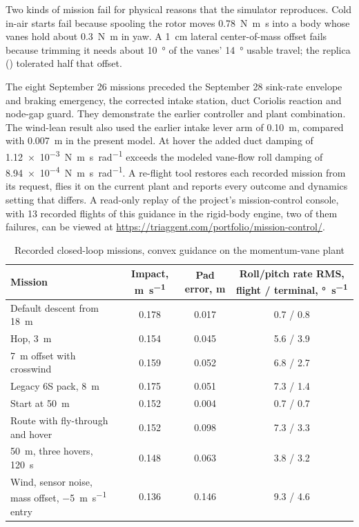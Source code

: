 \documentclass[10pt,letterpaper]{article}
\begin{document}
Two kinds of mission fail for physical reasons that the simulator reproduces.
Cold in-air starts fail because spooling the rotor moves \SI{0.78}{\newton\metre\second} into a body whose vanes hold about \SI{0.3}{\newton\metre} in yaw.
A \SI{1}{\centi\metre} lateral center-of-mass offset fails because trimming it needs about \SI{10}{\degree} of the vanes' \SI{14}{\degree} usable travel; the replica () tolerated half that offset.

The eight September 26 missions preceded the September 28 sink-rate envelope and braking emergency, the corrected intake station, duct Coriolis reaction and node-gap guard. They demonstrate the earlier controller and plant combination.
The wind-lean result also used the earlier intake lever arm of \SI{0.10}{\metre}, compared with \SI{0.007}{\metre} in the present model.
At hover the added duct damping of \SI{1.12e-3}{\newton\metre\second\per\radian} exceeds the modeled vane-flow roll damping of \SI{8.94e-4}{\newton\metre\second\per\radian}.
A re-flight tool restores each recorded mission from its request, flies it on the current plant and reports every outcome and dynamics setting that differs.
A read-only replay of the project's mission-control console, with 13 recorded flights of this guidance in the rigid-body engine, two of them failures, can be viewed at \url{https://triaggent.com/portfolio/mission-control/}.

\begin{table}[t]
\caption{Recorded closed-loop missions, convex guidance on the momentum-vane plant}
\label{tab:missions}
\centering
\small
\begin{tabular}{lccc}
\toprule
Mission & Impact, \si{\metre\per\second} & Pad error, \si{\metre} & Roll/pitch rate RMS, flight / terminal, \si{\degree\per\second} \\
\midrule
Default descent from \SI{18}{\metre} & 0.178 & 0.017 & 0.7 / 0.8 \\
Hop, \SI{3}{\metre} & 0.154 & 0.045 & 5.6 / 3.9 \\
\SI{7}{\metre} offset with crosswind & 0.159 & 0.052 & 6.8 / 2.7 \\
Legacy 6S pack, \SI{8}{\metre} & 0.175 & 0.051 & 7.3 / 1.4 \\
Start at \SI{50}{\metre} & 0.152 & 0.004 & 0.7 / 0.7 \\
Route with fly-through and hover & 0.152 & 0.098 & 7.3 / 3.3 \\
\SI{50}{\metre}, three hovers, \SI{120}{\second} & 0.148 & 0.063 & 3.8 / 3.2 \\
Wind, sensor noise, mass offset, \SI{-5}{\metre\per\second} entry & 0.136 & 0.146 & 9.3 / 4.6 \\
\bottomrule
\end{tabular}
\end{table}
\end{document}
